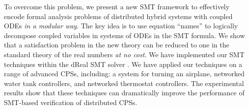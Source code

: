 

To overcome this problem, we present a new SMT framework
to  effectively encode formal analysis problems
of distributed hybrid systems with coupled ODEs \emph{in a modular
  way}.
The key idea is to use equation ``names'' %
to logically decompose coupled variables in systems of ODEs in the SMT formula.
We show that 
a satisfaction problem in  the new  theory 
can be reduced to one in the standard theory of the real numbers \emph{at no cost}.
%
We have implemented our SMT techniques within the \textsf{dReal} SMT
solver \cite{dReal}.
We have applied our techniques on a range of advanced CPSs, including:
a system for  turning an airplane, 
 networked water tank
 controllers,  and networked thermostat controllers.
The experimental results show that these techniques can dramatically improve
the performance of SMT-based verification of distributed CPSs.

